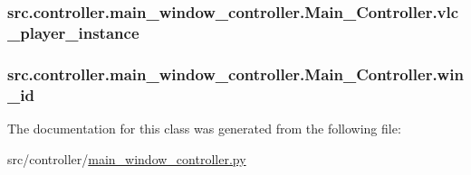 \subsubsection[{vlc\+\_\+player\+\_\+instance}]{\setlength{\rightskip}{0pt plus 5cm}src.\+controller.\+main\+\_\+window\+\_\+controller.\+Main\+\_\+\+Controller.\+vlc\+\_\+player\+\_\+instance}\label{classsrc_1_1controller_1_1main__window__controller_1_1Main__Controller_ac74106459573d2785bfc819d8eef41c3}
\hypertarget{classsrc_1_1controller_1_1main__window__controller_1_1Main__Controller_ad15c49dcab2e7227f2708e253aedebe9}{}
\subsubsection[{win\+\_\+id}]{\setlength{\rightskip}{0pt plus 5cm}src.\+controller.\+main\+\_\+window\+\_\+controller.\+Main\+\_\+\+Controller.\+win\+\_\+id}\label{classsrc_1_1controller_1_1main__window__controller_1_1Main__Controller_ad15c49dcab2e7227f2708e253aedebe9}


The documentation for this class was generated from the following file\+:\begin{DoxyCompactItemize}
\item 
src/controller/\hyperlink{main__window__controller_8py}{main\+\_\+window\+\_\+controller.\+py}\end{DoxyCompactItemize}
